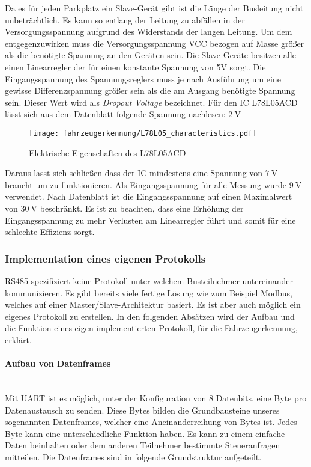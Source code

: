 Da es für jeden Parkplatz ein Slave-Gerät gibt ist die Länge der Busleitung nicht unbeträchtlich. Es kann so entlang der Leitung zu abfällen in der Versorgungsspannung aufgrund des Widerstands der langen Leitung.
Um dem entgegenzuwirken muss die Versorgungsspannung VCC bezogen auf Masse größer als die benötigte Spannung an den Geräten sein. Die Slave-Geräte besitzen alle einen Linearregler der für einen konstante Spannung von 5V sorgt.
Die Eingangsspannung des Spannungsreglers muss je nach Ausführung um eine gewisse Differenzspannung größer sein als die am Ausgang benötigte Spannung sein. Dieser Wert wird als \textit{Dropout Voltage} bezeichnet. 
Für den IC L78L05ACD lässt sich aus dem Datenblatt folgende Spannung nachlesen: $\SI{2}{\volt}$

\begin{figure}[H]
    \centering
    \texttt{[image: fahrzeugerkennung/L78L05\_characteristics.pdf]}
    \caption{Elektrische Eigenschaften des L78L05ACD}
\end{figure}

Daraus lasst sich schließen dass der IC mindestens eine Spannung von $\SI{7}{\volt}$ braucht um zu funktionieren. Als Eingangsspannung für alle Messung wurde $\SI{9}{\volt}$ verwendet. Nach Datenblatt ist die Eingangsspannung auf 
einen Maximalwert von $\SI{30}{\volt}$ beschränkt. Es ist zu beachten, dass eine Erhöhung der Eingangsspannung zu mehr Verlusten am Linearregler führt und somit für eine schlechte Effizienz sorgt.

\subsubsection{Implementation eines eigenen Protokolls}

RS485 spezifiziert keine Protokoll unter welchem Busteilnehmer untereinander kommunizieren. Es gibt bereits viele fertige Lösung wie zum Beispiel Modbus, welches auf einer Master/Slave-Architektur basiert. Es ist aber auch möglich ein eigenes Protokoll zu erstellen.
In den folgenden Absätzen wird der Aufbau und die Funktion eines eigen implementierten Protokoll, für die Fahrzeugerkennung, erklärt.
\pagebreak
\paragraph{Aufbau von Datenframes}\mbox{}\\

Mit UART ist es möglich, unter der Konfiguration von 8 Datenbits, eine Byte pro Datenaustausch zu senden. Diese Bytes bilden die Grundbausteine unseres sogenannten Datenframes, welcher eine Aneinanderreihung von Bytes ist. Jedes Byte
kann eine unterschiedliche Funktion haben. Es kann zu einem einfache Daten beinhalten oder dem anderen Teilnehmer bestimmte Steueranfragen mitteilen. Die Datenframes sind in folgende Grundstruktur aufgeteilt.

